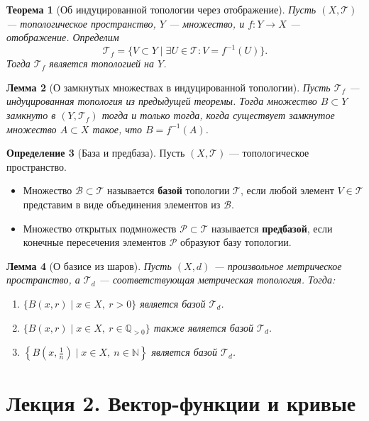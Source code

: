 \documentclass[12pt,a4paper]{article}
\newtheorem{theorem}{Теорема}[section]
\newtheorem{lemma}[theorem]{Лемма}
\theoremstyle{definition}
\newtheorem{definition}[theorem]{Определение}
\begin{document}
\begin{theorem}[Об индуцированной топологии через отображение]
Пусть $(X, \mathcal{T})$ --- топологическое пространство, $Y$ --- множество, и $f: Y \to X$ --- отображение. Определим
$$\mathcal{T}_f = \{V \subset Y \mid \exists U \in \mathcal{T}: V = f^{-1}(U)\}.$$
Тогда $\mathcal{T}_f$ является топологией на $Y$.
\end{theorem}

\begin{lemma}[О замкнутых множествах в индуцированной топологии]
Пусть $\mathcal{T}_f$ --- индуцированная топология из предыдущей теоремы. Тогда множество $B \subset Y$ замкнуто в $(Y, \mathcal{T}_f)$ тогда и только тогда, когда существует замкнутое множество $A \subset X$ такое, что $B = f^{-1}(A)$.
\end{lemma}

\begin{definition}[База и предбаза]
Пусть $(X, \mathcal{T})$ --- топологическое пространство.
\begin{itemize}
    \item Множество $\mathcal{B} \subset \mathcal{T}$ называется \textbf{базой} топологии $\mathcal{T}$, если любой элемент $V \in \mathcal{T}$ представим в виде объединения элементов из $\mathcal{B}$.
    \item Множество открытых подмножеств $\mathcal{P} \subset \mathcal{T}$ называется \textbf{предбазой}, если конечные пересечения элементов $\mathcal{P}$ образуют базу топологии.
\end{itemize}
\end{definition}

\begin{lemma}[О базисе из шаров]
Пусть $(X, d)$ --- произвольное метрическое пространство, а $\mathcal{T}_d$ --- соответствующая метрическая топология. Тогда:
\begin{enumerate}
    \item $\{B(x, r) \mid x \in X,\ r > 0\}$ является базой $\mathcal{T}_d$.
    \item $\{B(x, r) \mid x \in X,\ r \in \mathbb{Q}_{>0}\}$ также является базой $\mathcal{T}_d$.
    \item $\left\{B\left(x, \frac{1}{n}\right) \mid x \in X,\ n \in \mathbb{N}\right\}$ является базой $\mathcal{T}_d$.
\end{enumerate}
\end{lemma}

\section{Лекция 2. Вектор-функции и кривые}
\end{document}
